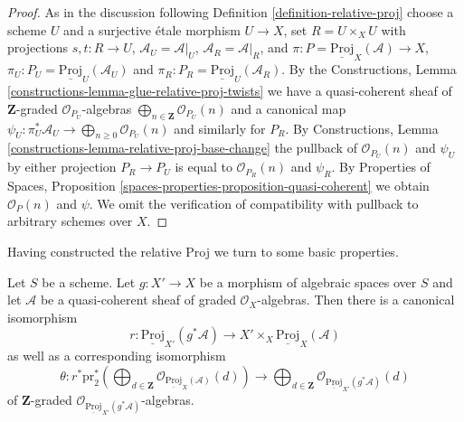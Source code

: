 \begin{proof}
As in the discussion following Definition \ref{definition-relative-proj}
choose a scheme $U$ and a surjective \'etale morphism
$U \to X$, set $R = U \times_X U$ with projections $s, t : R \to U$,
$\mathcal{A}_U = \mathcal{A}|_U$, $\mathcal{A}_R = \mathcal{A}|_R$,
and $\pi : P = \underline{\text{Proj}}_X(\mathcal{A}) \to X$,
$\pi_U : P_U = \underline{\text{Proj}}_U(\mathcal{A}_U)$ and
$\pi_R : P_R = \underline{\text{Proj}}_U(\mathcal{A}_R)$.
By the
Constructions, Lemma \ref{constructions-lemma-glue-relative-proj-twists}
we have a quasi-coherent sheaf of $\mathbf{Z}$-graded
$\mathcal{O}_{P_U}$-algebras
$\bigoplus_{n \in \mathbf{Z}} \mathcal{O}_{P_U}(n)$
and a canonical map
$\psi_U : \pi_U^*\mathcal{A}_U \to \bigoplus_{n \geq 0} \mathcal{O}_{P_U}(n)$
and similarly for $P_R$. By
Constructions, Lemma \ref{constructions-lemma-relative-proj-base-change}
the pullback of $\mathcal{O}_{P_U}(n)$ and $\psi_U$ by either projection
$P_R \to P_U$ is equal to $\mathcal{O}_{P_R}(n)$ and $\psi_R$.
By Properties of Spaces, Proposition
\ref{spaces-properties-proposition-quasi-coherent}
we obtain $\mathcal{O}_{P}(n)$ and $\psi$.
We omit the verification of compatibility with pullback to
arbitrary schemes over $X$.
\end{proof}

\noindent
Having constructed the relative Proj we turn to some basic
properties.

\begin{lemma}
\label{lemma-relative-proj-base-change}
Let $S$ be a scheme. Let $g : X' \to X$ be a morphism of algebraic spaces
over $S$ and let $\mathcal{A}$ be a quasi-coherent sheaf
of graded $\mathcal{O}_X$-algebras. Then there is a canonical isomorphism
$$
r :
\underline{\text{Proj}}_{X'}(g^*\mathcal{A})
\longrightarrow
X' \times_X \underline{\text{Proj}}_X(\mathcal{A})
$$
as well as a corresponding isomorphism
$$
\theta :
r^*\text{pr}_2^*\left(\bigoplus\nolimits_{d \in \mathbf{Z}}
\mathcal{O}_{\underline{\text{Proj}}_X(\mathcal{A})}(d)\right)
\longrightarrow
\bigoplus\nolimits_{d \in \mathbf{Z}}
\mathcal{O}_{\underline{\text{Proj}}_{X'}(g^*\mathcal{A})}(d)
$$
of $\mathbf{Z}$-graded
$\mathcal{O}_{\underline{\text{Proj}}_{X'}(g^*\mathcal{A})}$-algebras.
\end{lemma}

